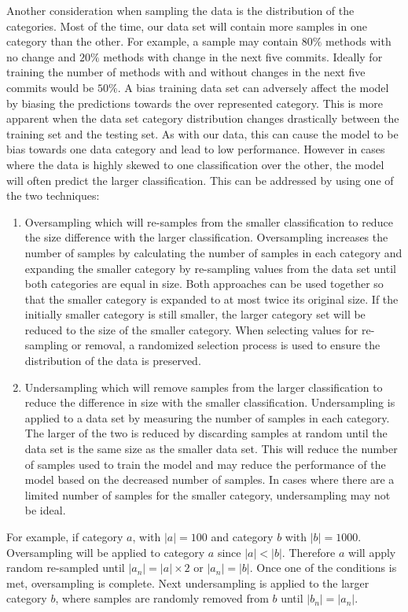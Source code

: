 Another consideration when sampling the data is the distribution of the categories. Most of the time, our data set will contain more samples in one category than the other. For example, a sample may contain $80\%$ methods with no change and $20\%$ methods with change in the next five commits. Ideally for training the number of methods with and without changes in the next five commits would be $50\%$. A bias training data set can adversely affect the model by biasing the predictions towards the over represented category. This is more apparent when the data set category distribution changes drastically between the training set and the testing set. As with our data, this can cause the model to be bias towards one data category and lead to low performance. However in cases where the data is highly skewed to one classification over the other, the model will often predict the larger classification. This can be addressed by using one of the two techniques:
\begin{enumerate}
\item Oversampling which will re-samples from the smaller classification to reduce the size difference with the larger classification. Oversampling increases the number of samples by calculating the number of samples in each category and expanding the smaller category by re-sampling values from the data set until both categories are equal in size. Both approaches can be used together so that the smaller category is expanded to at most twice its original size. If the initially smaller category is still smaller, the larger category set will be reduced to the size of the smaller category. When selecting values for re-sampling or removal, a randomized selection process is used to ensure the distribution of the data is preserved.
\item Undersampling which will remove samples from the larger classification to reduce the difference in size with the smaller classification. Undersampling is applied to a data set by measuring the number of samples in each category. The larger of the two is reduced by discarding samples at random until the data set is the same size as the smaller data set. This will reduce the number of samples used to train the model and may reduce the performance of the model based on the decreased number of samples. In cases where there are a limited number of samples for the smaller category, undersampling may not be ideal.
\end{enumerate}
For example, if category $a$, with $|a| = 100$ and category $b$ with $|b| = 1000$. Oversampling will be applied to category $a$ since $|a| < |b|$. Therefore $a$ will apply random re-sampled until $|a_n| = |a| \times 2$ or $|a_n| = |b|$. Once one of the conditions is met, oversampling is complete. Next undersampling is applied to the larger category $b$, where samples are randomly removed from $b$ until $|b_n| = |a_n|$.

